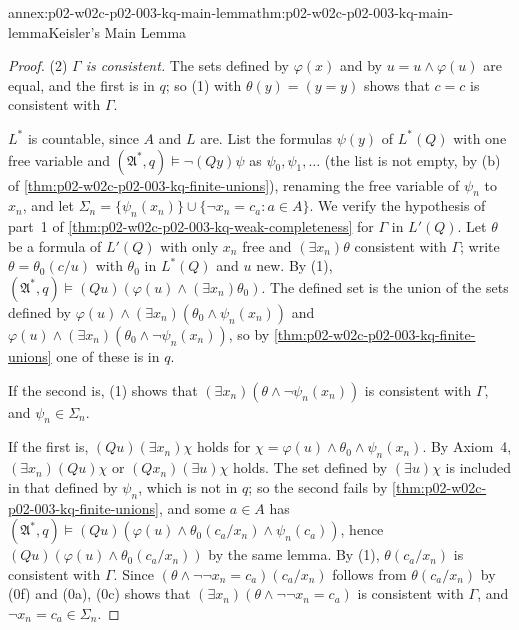 \begin{annexitem}{annex:p02-w02c-p02-003-kq-main-lemma}{thm:p02-w02c-p02-003-kq-main-lemma}{Keisler's Main Lemma}
\begin{proof}
(2) \emph{\(\Gamma\) is consistent.}  The sets defined by \(\varphi(x)\)
and by \(u=u\land\varphi(u)\) are equal, and the first is in \(q\); so (1)
with \(\theta(y)=(y=y)\) shows that \(c=c\) is consistent with \(\Gamma\).

\(L^{*}\) is countable, since \(A\) and \(L\) are.  List the formulas
\(\psi(y)\) of \(L^{*}(Q)\) with one free variable and
\((\mathfrak A^{*},q)\models\neg(Qy)\psi\) as \(\psi_0,\psi_1,\ldots\)
(the list is not empty, by (b) of
\cref{thm:p02-w02c-p02-003-kq-finite-unions}), renaming the free variable of
\(\psi_n\) to \(x_n\), and let
\(\Sigma_n=\{\psi_n(x_n)\}\cup\{\neg x_n=c_a:a\in A\}\).  We verify the
hypothesis of part~1 of \cref{thm:p02-w02c-p02-003-kq-weak-completeness} for
\(\Gamma\) in \(L'(Q)\).  Let \(\theta\) be a formula of \(L'(Q)\) with only
\(x_n\) free and \((\exists x_n)\theta\) consistent with \(\Gamma\); write
\(\theta=\theta_0(c/u)\) with \(\theta_0\) in \(L^{*}(Q)\) and \(u\) new.
By (1),
\((\mathfrak A^{*},q)\models(Qu)(\varphi(u)\land(\exists x_n)\theta_0)\).  The
defined set is the union of the sets defined by
\(\varphi(u)\land(\exists x_n)(\theta_0\land\psi_n(x_n))\) and
\(\varphi(u)\land(\exists x_n)(\theta_0\land\neg\psi_n(x_n))\), so by
\cref{thm:p02-w02c-p02-003-kq-finite-unions} one of these is in \(q\).

If the second is, (1) shows that \((\exists
x_n)(\theta\land\neg\psi_n(x_n))\) is consistent with \(\Gamma\), and
\(\psi_n\in\Sigma_n\).

If the first is, \((Qu)(\exists x_n)\chi\) holds for
\(\chi=\varphi(u)\land\theta_0\land\psi_n(x_n)\).  By Axiom~4,
\((\exists x_n)(Qu)\chi\) or \((Qx_n)(\exists u)\chi\) holds.  The set
defined by \((\exists u)\chi\) is included in that defined by \(\psi_n\),
which is not in \(q\); so the second fails by
\cref{thm:p02-w02c-p02-003-kq-finite-unions}, and some \(a\in A\) has
\((\mathfrak A^{*},q)\models(Qu)(\varphi(u)\land\theta_0(c_a/x_n)\land\psi_n(c_a))\),
hence \((Qu)(\varphi(u)\land\theta_0(c_a/x_n))\) by the same lemma.  By (1),
\(\theta(c_a/x_n)\) is consistent with \(\Gamma\).  Since
\((\theta\land\neg\neg x_n=c_a)(c_a/x_n)\) follows from \(\theta(c_a/x_n)\)
by (0f) and (0a), (0c) shows that \((\exists x_n)(\theta\land\neg\neg
x_n=c_a)\) is consistent with \(\Gamma\), and \(\neg x_n=c_a\in\Sigma_n\).


\end{proof}
\end{annexitem}
